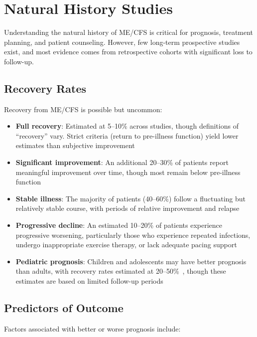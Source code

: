 \section{Natural History Studies}
\label{sec:natural-history}

Understanding the natural history of ME/CFS is critical for prognosis, treatment planning, and patient counseling. However, few long-term prospective studies exist, and most evidence comes from retrospective cohorts with significant loss to follow-up.

\subsection{Recovery Rates}

Recovery from ME/CFS is possible but uncommon:

\begin{itemize}
    \item \textbf{Full recovery}: Estimated at 5--10\% across studies, though definitions of ``recovery'' vary. Strict criteria (return to pre-illness function) yield lower estimates than subjective improvement
    \item \textbf{Significant improvement}: An additional 20--30\% of patients report meaningful improvement over time, though most remain below pre-illness function
    \item \textbf{Stable illness}: The majority of patients (40--60\%) follow a fluctuating but relatively stable course, with periods of relative improvement and relapse
    \item \textbf{Progressive decline}: An estimated 10--20\% of patients experience progressive worsening, particularly those who experience repeated infections, undergo inappropriate exercise therapy, or lack adequate pacing support
    \item \textbf{Pediatric prognosis}: Children and adolescents may have better prognosis than adults, with recovery rates estimated at 20--50\%~\cite{Joyce1997prognosis, Rowe2019pediatric}, though these estimates are based on limited follow-up periods
\end{itemize}

\subsection{Predictors of Outcome}

Factors associated with better or worse prognosis include:

